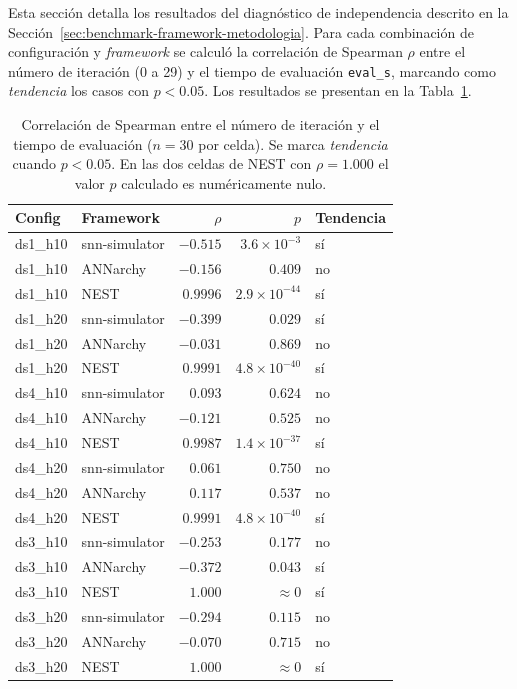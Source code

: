 Esta sección detalla los resultados del diagnóstico de independencia descrito en la Sección~\ref{sec:benchmark-framework-metodologia}. Para cada combinación de configuración y \textit{framework} se calculó la correlación de Spearman $\rho$ entre el número de iteración (0 a 29) y el tiempo de evaluación \texttt{eval\_s}, marcando como \textit{tendencia} los casos con $p<0.05$. Los resultados se presentan en la Tabla~\ref{tab:anexo-spearman}.

\begin{table}[htbp]
\centering
\small
\caption{Correlación de Spearman entre el número de iteración y el tiempo de evaluación ($n=30$ por celda). Se marca \textit{tendencia} cuando $p<0.05$. En las dos celdas de NEST con $\rho=1.000$ el valor $p$ calculado es numéricamente nulo.}
\label{tab:anexo-spearman}
\begin{tabular}{llrrl}
\toprule
Config & Framework & $\rho$ & $p$ & Tendencia \\
\midrule
ds1\_h10 & snn-simulator & $-0.515$ & $3.6\times10^{-3}$  & sí \\
ds1\_h10 & ANNarchy      & $-0.156$ & $0.409$             & no \\
ds1\_h10 & NEST          & $0.9996$ & $2.9\times10^{-44}$ & sí \\ \hline
ds1\_h20 & snn-simulator & $-0.399$ & $0.029$             & sí \\
ds1\_h20 & ANNarchy      & $-0.031$ & $0.869$             & no \\
ds1\_h20 & NEST          & $0.9991$ & $4.8\times10^{-40}$ & sí \\ \hline
ds4\_h10 & snn-simulator & $0.093$  & $0.624$             & no \\
ds4\_h10 & ANNarchy      & $-0.121$ & $0.525$             & no \\
ds4\_h10 & NEST          & $0.9987$ & $1.4\times10^{-37}$ & sí \\ \hline
ds4\_h20 & snn-simulator & $0.061$  & $0.750$             & no \\
ds4\_h20 & ANNarchy      & $0.117$  & $0.537$             & no \\
ds4\_h20 & NEST          & $0.9991$ & $4.8\times10^{-40}$ & sí \\ \hline
ds3\_h10 & snn-simulator & $-0.253$ & $0.177$             & no \\
ds3\_h10 & ANNarchy      & $-0.372$ & $0.043$             & sí \\
ds3\_h10 & NEST          & $1.000$  & $\approx 0$         & sí \\ \hline
ds3\_h20 & snn-simulator & $-0.294$ & $0.115$             & no \\
ds3\_h20 & ANNarchy      & $-0.070$ & $0.715$             & no \\
ds3\_h20 & NEST          & $1.000$  & $\approx 0$         & sí \\
\bottomrule
\end{tabular}
\end{table}

